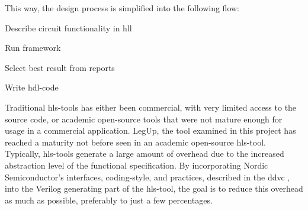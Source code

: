 This way, the design process is simplified into the following flow:
\begin{compactenum}
    \item Describe circuit functionality in \gls{hll}
    \item Run framework
    \item Select best result from reports
    \item Write \gls{hdl}-code
\end{compactenum}
Traditional \gls{hls}-tools has either been commercial, with very limited access to the source code, or academic open-source tools that were not mature enough for usage in a commercial application. LegUp, the tool examined in this project has reached a maturity not before seen in an academic open-source \gls{hls}-tool. Typically, \gls{hls}-tools generate a large amount of overhead due to the increased abstraction level of the functional specification. By incorporating Nordic Semiconductor's interfaces, coding-style, and practices, described in the \gls{ddvc} \cite{nordicddvc}, into the Verilog generating part of the \gls{hls}-tool, the goal is to reduce this overhead as much as possible, preferably to just a few percentages.

